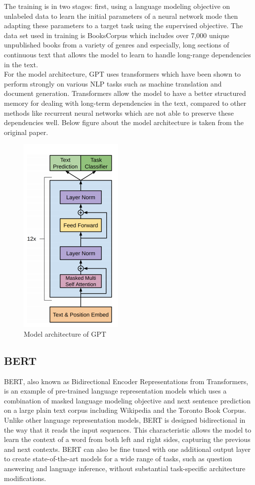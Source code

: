 \documentclass{article}
\begin{document}
The training is in two stages: first, using a language modeling objective on unlabeled data to learn the initial parameters of a neural network mode then adapting these parameters to a target task using the supervised objective. The data set used in training is BooksCorpus which includes over 7,000 unique unpublished books from a variety of genres and especially, long sections of continuous text that allows the model to learn to handle long-range dependencies in the text. \cite{bookscorpus}\\

For the model architecture, GPT uses transformers which have been shown to perform strongly on various NLP tasks such as machine translation and document generation. Transformers allow the model to have a better structured memory for dealing with long-term dependencies in the text, compared to other methods like recurrent neural networks which are not able to preserve these dependencies well. Below figure about the model architecture is taken from the original paper.

\begin{figure}[H]
	\centering
	\includegraphics[scale=0.65]{reports/Final report/images/gpt_model.png}
	\caption{Model architecture of GPT}
	\label{fig:gpt}
\end{figure}


\subsection*{BERT }

BERT, also known as Bidirectional Encoder Representations from Transformers, is an example of pre-trained language representation models which uses a combination of masked language modeling objective and next sentence prediction on a large plain text corpus including Wikipedia and the Toronto Book Corpus. Unlike other language representation models, BERT is designed bidirectional in the way that it reads the input sequences. This characteristic allows the model to learn the context of a word from both left and right sides, capturing the previous and next contexts. BERT can also be fine tuned with one additional output layer to create state-of-the-art models for a wide range of tasks, such as question answering and language inference, without substantial task-specific architecture modifications. \cite{devlin2019bert}
\end{document}
